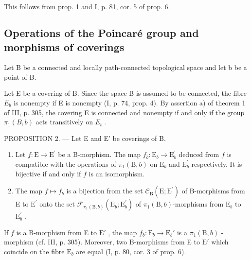 This follows from prop. 1 and I, p. 81, cor. 5 of prop. 6.

\subsection{Operations of the Poincaré group and morphisms of coverings}

Let B be a connected and locally path-connected topological space and let b be a point of B.

Let E be a covering of B. Since the space B is assumed to be connected, the fibre \(E_{b}\) is nonempty if E is nonempty (I, p. 74, prop. 4). By assertion a) of theorem 1 of III, p. 305, the covering E is connected and nonempty if and only if the group \(\pi_{1}(B,b)\) acts transitively on \(E_{b}\) .

PROPOSITION 2. --- Let E and E' be coverings of B.

\begin{enumerate}
\def\labelenumi{\alph{enumi})}
\item
  Let \(f\colon\mathrm{E}\to\mathrm{E}^{\prime}\) be a B-morphism. The map \(f_{b}\colon\mathrm{E}_{b}\to\mathrm{E}_{b}^{\prime}\) deduced from \(f\) is compatible with the operations of \(\pi_{1}(\mathrm{B},b)\) on \(\mathrm{E}_{b}\) and \(\mathrm{E}_{b}^{\prime}\) respectively. It is bijective if and only if \(f\) is an isomorphism.
\item
  The map \(f\mapsto f_{b}\) is a bijection from the set \(\mathcal{C}_{\mathrm{B}}(\mathrm{E};\mathrm{E}^{\prime})\) of B-morphisms from E to \(\mathrm{E}^{\prime}\) onto the set \(\mathcal{F}_{\pi_1(\mathrm{B},b)}(\mathrm{E}_b;\mathrm{E}_b^{\prime})\) of \(\pi_1(\mathrm{B},b)\)-morphisms from \(\mathrm{E}_b\) to \(\mathrm{E}_b^{\prime}\) .
\end{enumerate}

If \(f\) is a B-morphism from E to \(\mathrm{E}'\) , the map \(f_b\colon \mathrm{E}_b\to \mathrm{E}_b'\) is a \(\pi_1(\mathrm{B},b)\) -morphism (cf. III, p. 305). Moreover, two B-morphisms from E to \(\mathrm{E}'\) which coincide on the fibre \(\mathrm{E}_b\) are equal (I, p. 80, cor. 3 of prop. 6).

